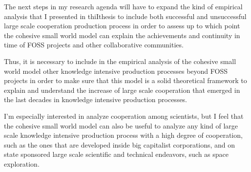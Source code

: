 The next steps in my research agenda will have to expand the kind of empirical analysis that I presented in thiIthesis to include both successful and unsuccessful large scale cooperation production process in order to assess up to which point the cohesive small world model can explain the achievements and continuity in time of FOSS projects and other collaborative communities.

Thus, it is necessary to include in the empirical analysis of the cohesive small world model other knowledge intensive production processes beyond FOSS projects in order to make sure that this model is a solid theoretical framework to explain and understand the increase of large scale cooperation that emerged in the last decades in knowledge intensive production processes.

I'm especially interested in analyze cooperation among scientists, but I feel that the cohesive small world model can also be useful to analyze any kind of large scale knowledge intensive production process with a high degree of cooperation, such as the ones that are developed inside big capitalist corporations, and on state sponsored large scale scientific and technical endeavors, such as space exploration.
